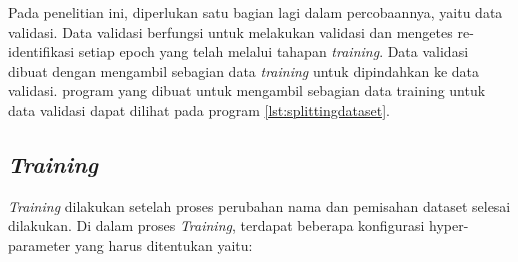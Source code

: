 

Pada penelitian ini, diperlukan satu bagian lagi dalam percobaannya, yaitu data validasi. 
Data validasi berfungsi untuk melakukan validasi dan mengetes re-identifikasi setiap epoch yang telah 
melalui tahapan \emph{training}. Data validasi dibuat dengan mengambil sebagian data \emph{training} 
untuk dipindahkan ke data validasi. program yang dibuat untuk mengambil sebagian data training untuk 
data validasi dapat dilihat pada program \ref{lst:splittingdataset}.\\



\subsection{\emph{Training}}

\emph{Training} dilakukan setelah proses perubahan nama dan pemisahan dataset selesai \linebreak dilakukan. 
Di dalam proses \emph{Training}, terdapat beberapa konfigurasi hyper-parameter yang harus 
ditentukan yaitu:

